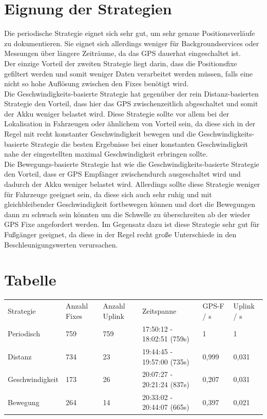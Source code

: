\section{Eignung der Strategien}
Die periodische Strategie eignet sich sehr gut, um sehr genaue Positionsverläufe zu dokumentieren. Sie eignet sich allerdings weniger für Backgroundservices oder Messungen über längere Zeiträume, da das GPS dauerhat eingeschaltet ist.\\
Der einzige Vorteil der zweiten Strategie liegt darin, dass die Positionsfixe gefiltert werden und somit weniger Daten verarbeitet werden müssen, falls eine nicht so hohe Auflösung zwischen den Fixes benötigt wird.\\
Die Geschwindigkeits-basierte Strategie hat gegenüber der rein Distanz-basierten Strategie den Vorteil, dass hier das GPS zwischenzeitlich abgeschaltet und somit der Akku weniger belastet wird. Diese Strategie sollte vor allem bei der Lokalisation in Fahrzeugen oder ähnlichem von Vorteil sein, da diese sich in der Regel mit recht konstanter Geschwindigkeit bewegen und die Geschwindigkeits-basierte Strategie die besten Ergebnisse bei einer konstanten Geschwindigkeit nahe der eingestellten maximal Geschwindigkeit erbringen sollte.\\
Die Bewegungs-basierte Strategie hat wie die Geschwindigkeits-basierte Strategie den Vorteil, dass er GPS Empfänger zwischendurch ausgeschaltet wird und dadurch der Akku weniger belastet wird. Allerdings sollte diese Strategie weniger für Fahrzeuge geeignet sein, da diese sich auch sehr ruhig und mit gleichbleibender Geschwindigkeit fortbewegen können und dort die Bewegungen dann zu schwach sein könnten um die Schwelle zu überschreiten ab der wieder GPS Fixe angefordert werden. Im Gegensatz dazu ist diese Strategie sehr gut für Fußgänger geeignet, da diese in der Regel recht große Unterschiede in den Beschleunigungswerten verursachen.

\section{Tabelle}

\centering
\begin{tabular}{llllll}
Strategie       & Anzahl Fixes & Anzahl Uplink & Zeitspanne                 & GPS-F / s & Uplink / s \\
Periodisch      & 759          & 759           & 17:50:12 - 18:02:51 (759s) & 1         & 1          \\
Distanz         & 734          & 23            & 19:44:45 - 19:57:00 (735s) & 0,999     & 0,031      \\
Geschwindigkeit & 173          & 26            & 20:07:27 - 20:21:24 (837s) & 0,207     & 0,031      \\
Bewegung        & 264          & 14            & 20:33:02 - 20:44:07 (665s) & 0,397     & 0,021    
\end{tabular}

